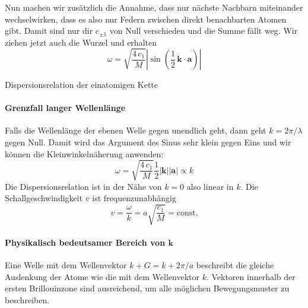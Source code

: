 Nun machen wir zusätzlich die Annahme, dass nur nächste Nachbarn miteinander wechselwirken, dass es also nur Federn zwischen direkt benachbarten Atomen gibt. Damit sind nur dir $c_{\pm 1}$ von Null verschieden und die Summe fällt weg. Wir ziehen jetzt auch die Wurzel und erhalten
\begin{equation}
\omega = \sqrt{\frac{4 \, c_1}{M}} \left| \sin (\frac{1}{2} \, \mathbf{k} \cdot \mathbf{a}  ) \right| \label{eq:phonon_1atom}
\end{equation}

\begin{marginfigure}

\caption{Dispersionsrelation der einatomigen Kette}
\end{marginfigure}


\paragraph{Grenzfall langer Wellenlänge} Falls die Wellenlänge der ebenen Welle gegen unendlich geht, dann geht $k = 2 \pi / \lambda$  gegen Null. Damit wird das Argument des Sinus sehr klein gegen Eins und wir können die Kleinwinkelnäherung anwenden:
\begin{equation}
\omega = \sqrt{\frac{4 \, c_1}{M}} \frac{1}{2}  |\mathbf{k}| | \mathbf{a}| \propto k
\end{equation}
Die Dispersionsrelation ist in der Nähe von $k = 0$ also linear in $k$. Die Schallgeschwindigkeit $v$ ist frequenzunabhängig
\begin{equation}
 v = \frac{\omega}{k} = a  \sqrt{\frac{ c_1}{M}}  = \text{const.}
\end{equation}



\paragraph{Physikalisch bedeutsamer Bereich von $\mathbf{k}$} 

\begin{marginfigure}

\caption{Eine Welle mit dem Wellenvektor $k + G = k + 2\pi /a$ beschreibt die gleiche Auslenkung der Atome wie die mit dem Wellenvektor $k$.  Vektoren innerhalb der ersten Brillouinzone sind ausreichend, um alle möglichen Bewegungsmuster zu beschreiben. \label{fig:phonon_k_plus_g} }
\end{marginfigure}


